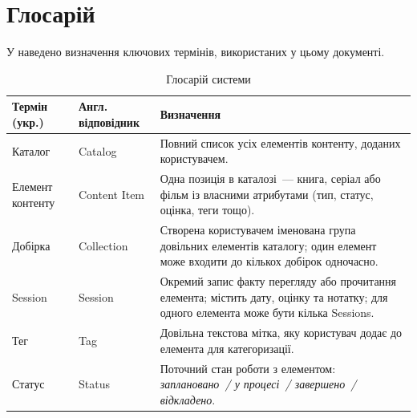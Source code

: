 \section{Глосарій}
\label{sec:hlosarii}

У  наведено визначення ключових термінів, використаних у цьому документі.

\begin{table}[h]
\caption{Глосарій системи}
\label{tab:hlosarii}
\begin{tabular}{L{3.5cm} L{3.5cm} L{7cm}}
\toprule
\textbf{Термін (укр.)} & \textbf{Англ. відповідник} & \textbf{Визначення} \\
\midrule
Каталог & Catalog & Повний список усіх елементів контенту, доданих користувачем.  \\
\addlinespace
Елемент контенту & Content Item & Одна позиція в каталозі~--- книга, серіал або фільм із власними атрибутами (тип, статус, оцінка, теги тощо).  \\
\addlinespace
Добірка & Collection & Створена користувачем іменована група довільних елементів каталогу; один елемент може входити до кількох добірок одночасно.  \\
\addlinespace
Session & Session & Окремий запис факту перегляду або прочитання елемента; містить дату, оцінку та нотатку; для одного елемента може бути кілька Sessions.  \\
\addlinespace
Тег & Tag & Довільна текстова мітка, яку користувач додає до елемента для категоризації.  \\
\addlinespace
Статус & Status & Поточний стан роботи з елементом: \emph{заплановано~/ у процесі~/ завершено~/ відкладено}.  \\
\bottomrule
\end{tabular}
\end{table}
